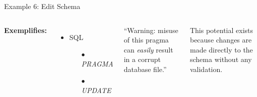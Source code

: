 \documentclass{beamer}
\begin{document}
\begin{frame}{Example 6: Edit Schema}

\begin{columns}
 \scriptsize 

{\bf Exemplifies:}
\begin{itemize} \setlength\itemindent{-5pt}%
	\item SQL
	\begin{itemize} \setlength\itemindent{-20pt} \scriptsize
		\item[$\bullet$] \textit{PRAGMA}
		\item[$\bullet$] \textit{UPDATE}
	\end{itemize}
\end{itemize}

\vspace{12pt} ``Warning: misuse of this pragma can \textit{easily} result in a corrupt database file.''

\vspace{12pt} This potential exists because changes are made directly to the schema without any validation.



\end{columns}

\end{frame}
\end{document}
